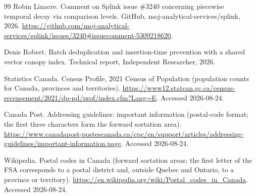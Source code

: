 \documentclass[11pt]{article}
\begin{document}
\begin{thebibliography}{99}
Robin Linacre.
\newblock Comment on Splink issue \#3240 concerning piecewise temporal decay via comparison levels.
\newblock GitHub, moj-analytical-services/splink, 2026.
\newblock \url{https://github.com/moj-analytical-services/splink/issues/3240#issuecomment-5309218620}.

Denis Robert.
\newblock Batch deduplication and insertion-time prevention with a shared vector canopy index.
\newblock Technical report, Independent Researcher, 2026.

Statistics Canada.
\newblock Census Profile, 2021 Census of Population (population counts for Canada, provinces and territories).
\newblock \url{https://www12.statcan.gc.ca/census-recensement/2021/dp-pd/prof/index.cfm?Lang=E}.
\newblock Accessed 2026-08-24.

Canada Post.
\newblock Addressing guidelines: important information (postal-code format; the first three characters form the forward sortation area).
\newblock \url{https://www.canadapost-postescanada.ca/cpc/en/support/articles/addressing-guidelines/important-information.page}.
\newblock Accessed 2026-08-24.

Wikipedia.
\newblock Postal codes in Canada (forward sortation areas; the first letter of the FSA corresponds to a postal district and, outside Quebec and Ontario, to a province or territory).
\newblock \url{https://en.wikipedia.org/wiki/Postal_codes_in_Canada}.
\newblock Accessed 2026-08-24.

\end{thebibliography}
\end{document}
